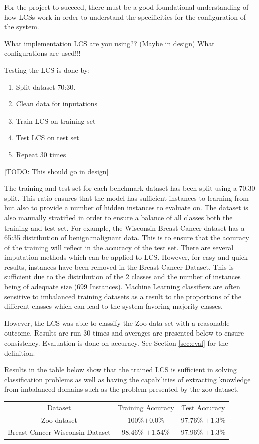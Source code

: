 For the project to succeed, there must be a good foundational understanding of how LCSs work in order to understand the specificities for the configuration of the system. 

What implementation LCS are you using?? (Maybe in design)
What configurations are used!!!

Testing the LCS is done by:
\begin{enumerate}
	\item Split dataset 70:30. 
	\item Clean data for inputations
	\item Train LCS on training set
	\item Test LCS on test set
	\item Repeat 30 times
\end{enumerate}

[TODO: This should go in design]

The training and test set for each benchmark dataset has been split using a 70:30 split. This ratio ensures that the model has sufficient instances to learning from but also to provide a number of hidden instances to evaluate on. The dataset is also manually stratified in order to ensure a balance of all classes both the training and test set. For example, the Wisconsin Breast Cancer dataset has a 65:35 distribution of benign:malignant data. This is to ensure that the accuracy of the training will reflect in the accuracy of the test set. There are several imputation methods which can be applied to LCS. However, for easy and quick results, instances have been removed in the Breast Cancer Dataset. This is sufficient due to the distribution of the 2 classes and the number of instances being of adequate size (699 Instances).  Machine Learning classifiers are often sensitive to imbalanced training datasets as a result to the proportions of the different classes which can lead to the system favoring majority classes. 


However, the LCS was able to classify the Zoo data set with a reasonable outcome. Results are run 30 times and averages are presented below to ensure consistency. Evaluation is done on accuracy. See Section \ref{sec:eval} for the definition.

Results in the table below show that the trained LCS is sufficient in solving classification problems as well as having the capabilities of extracting knowledge from imbalanced domains such as the problem presented by the zoo dataset.

\begin{center}
	\begin{tabular}{ |c|c|c| } 
		\hline
		Dataset & Training Accuracy & Test Accuracy \\ 
		Zoo dataset & 100\%$\pm0.0\% $ & 97.76\% $\pm1.3\% $ \\ 
		Breast Cancer Wisconsin Dataset & 98.46\% $ \pm1.54\% $& 97.96\% $ \pm1.3\% $\\ 
		\hline
	\end{tabular}
\end{center}


